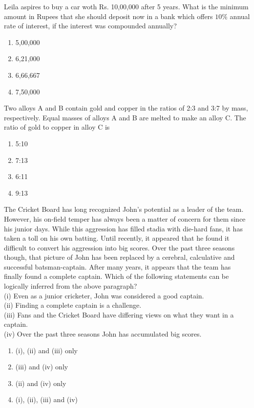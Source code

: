 \item Leila aspires to buy a car woth Rs. 10,00,000 after 5 years. What is the minimum amount in Rupees that she should deposit now in a bank which offers $10\%$ annual rate of interest, if the interest was compounded annually?
\begin{enumerate}
\item 5,00,000
\item 6,21,000
\item 6,66,667
\item 7,50,000
\end{enumerate}

\item Two alloys A and B contain gold and copper in the ratios of 2:3 and 3:7 by mass, respectively. Equal masses of alloys A and B are melted to make an alloy C. The ratio of gold to copper in alloy C is
\begin{enumerate}
\item 5:10
\item 7:13
\item 6:11
\item 9:13
\end{enumerate}

\item The Cricket Board has long recognized John's potential as a leader of the team. However, his on-field temper has always been a matter of concern for them since his junior days. While this aggression has filled stadia with die-hard fans, it has taken a toll on his own batting. Until recently, it appeared that he found it difficult to convert his aggression into big scores. Over the past three seasons though, that picture of John has been replaced by a cerebral, calculative and successful batsman-captain. After many years, it appears that the team has finally found a complete captain. Which of the following statements can be logically inferred from the above paragraph?\\
(i) Even as a junior cricketer, John was considered a good captain.\\
(ii) Finding a complete captain is a challenge.\\
(iii) Fans and the Cricket Board have differing views on what they want in a captain.\\
(iv) Over the past three seasons John has accumulated big scores.
\begin{enumerate}
\item (i), (ii) and (iii) only
\item (iii) and (iv) only
\item  (ii) and (iv) only
\item (i), (ii), (iii) and (iv)
\end{enumerate}


